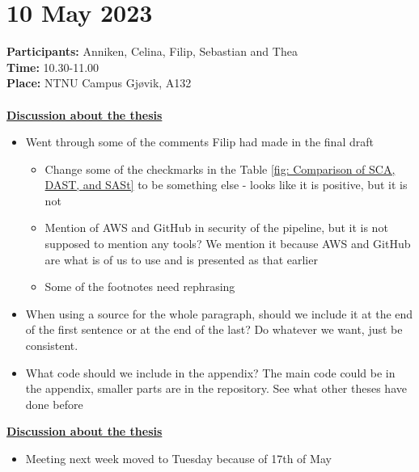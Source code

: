 \section{10 May 2023}
\textbf{Participants:} Anniken, Celina, Filip, Sebastian and Thea\\
\textbf{Time:} 10.30-11.00 \\
\textbf{Place:} NTNU Campus Gjøvik, A132
\\~\\
\textbf{\underline{Discussion about the thesis}}
\begin{itemize}
    \item Went through some of the comments Filip had made in the final draft
        \begin{itemize}
            \item Change some of the checkmarks in the Table \ref{fig: Comparison of SCA, DAST, and SASt} to be something else - looks like it is positive, but it is not
            \item Mention of AWS and GitHub in security of the pipeline, but it is not supposed to mention any tools? We mention it because AWS and GitHub are what is  of us to use and is presented as that earlier
            \item Some of the footnotes need rephrasing
        \end{itemize}
    \item When using a source for the whole paragraph, should we include it at the end of the first sentence or at the end of the last? Do whatever we want, just be consistent. 
    \item What code should we include in the appendix? The main code could be in the appendix, smaller parts are in the repository. See what other theses have done before
\end{itemize}

\textbf{\underline{Discussion about the thesis}}
\begin{itemize}
    \item Meeting next week moved to Tuesday because of 17th of May
\end{itemize}